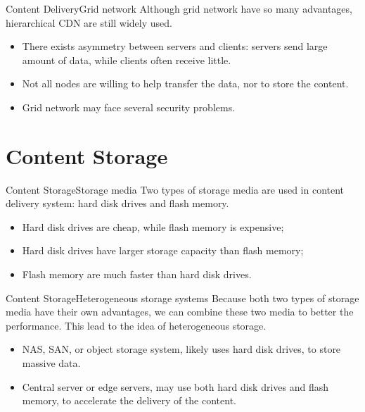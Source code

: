 \documentclass{beamer}
\begin{document}
  \begin{frame}{Content Delivery}{Grid network}
    Although grid network have so many advantages, hierarchical CDN are still widely used.
    \pause
    \begin{itemize}[<+->]
      \item There exists asymmetry between servers and clients: servers send large amount of data, while clients often receive little.
      \item Not all nodes are willing to help transfer the data, nor to store the content.
      \item Grid network may face several security problems.
    \end{itemize}
  \end{frame}

  \section{Content Storage}
  \begin{frame}{Content Storage}{Storage media}
    Two types of storage media are used in content delivery system: hard disk drives and flash memory. 
    \pause
    \begin{itemize}[<+->]
      \item Hard disk drives are cheap, while flash memory is expensive;
      \item Hard disk drives have larger storage capacity than flash memory;
      \item Flash memory are much faster than hard disk drives.
    \end{itemize}
  \end{frame}

  \begin{frame}{Content Storage}{Heterogeneous storage systems}
    Because both two types of storage media have their own advantages, we can combine these two media to better the performance. This lead to the idea of heterogeneous storage.
    \pause
    \begin{itemize}
      \item NAS, SAN, or object storage system, likely uses hard disk drives, to store massive data.
      \item Central server or edge servers, may use both hard disk drives and flash memory, to accelerate the delivery of the content.
    \end{itemize}
  \end{frame}
  
\end{document}
